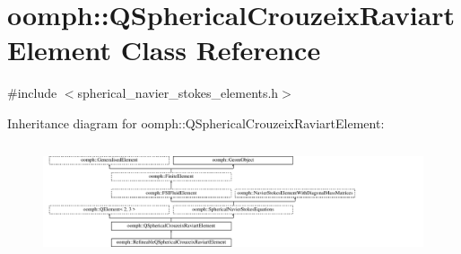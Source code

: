 \hypertarget{classoomph_1_1QSphericalCrouzeixRaviartElement}{}\section{oomph\+:\+:Q\+Spherical\+Crouzeix\+Raviart\+Element Class Reference}
\label{classoomph_1_1QSphericalCrouzeixRaviartElement}


{\ttfamily \#include $<$spherical\+\_\+navier\+\_\+stokes\+\_\+elements.\+h$>$}

Inheritance diagram for oomph\+:\+:Q\+Spherical\+Crouzeix\+Raviart\+Element\+:\begin{figure}[H]
\begin{center}
\leavevmode
\includegraphics[height=3.343283cm]{classoomph_1_1QSphericalCrouzeixRaviartElement}
\end{center}
\end{figure}
